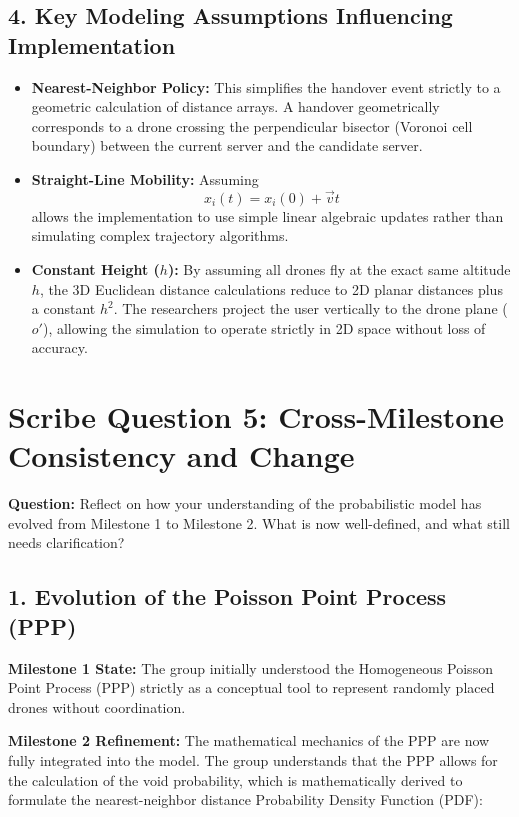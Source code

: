 \documentclass[12pt,a4paper]{article}
\begin{document}
\subsection{4. Key Modeling Assumptions Influencing Implementation}

\begin{itemize}
    \item \textbf{Nearest-Neighbor Policy:} This simplifies the handover event strictly to a geometric calculation of distance arrays. A handover geometrically corresponds to a drone crossing the perpendicular bisector (Voronoi cell boundary) between the current server and the candidate server.

    \item \textbf{Straight-Line Mobility:} Assuming 
    \[
    x_i(t) = x_i(0) + \vec{v}t
    \]
    allows the implementation to use simple linear algebraic updates rather than simulating complex trajectory algorithms.

    \item \textbf{Constant Height ($h$):} By assuming all drones fly at the exact same altitude $h$, the 3D Euclidean distance calculations reduce to 2D planar distances plus a constant $h^2$. The researchers project the user vertically to the drone plane ($o'$), allowing the simulation to operate strictly in 2D space without loss of accuracy.
\end{itemize}

\newpage
\section{Scribe Question 5: Cross-Milestone Consistency and Change}

\textbf{Question:} Reflect on how your understanding of the probabilistic model has evolved from Milestone 1 to Milestone 2. What is now well-defined, and what still needs clarification?

\subsection{1. Evolution of the Poisson Point Process (PPP)}

\textbf{Milestone 1 State:} The group initially understood the Homogeneous Poisson Point Process (PPP) strictly as a conceptual tool to represent randomly placed drones without coordination.

\textbf{Milestone 2 Refinement:} The mathematical mechanics of the PPP are now fully integrated into the model. The group understands that the PPP allows for the calculation of the void probability, which is mathematically derived to formulate the nearest-neighbor distance Probability Density Function (PDF):
\end{document}
